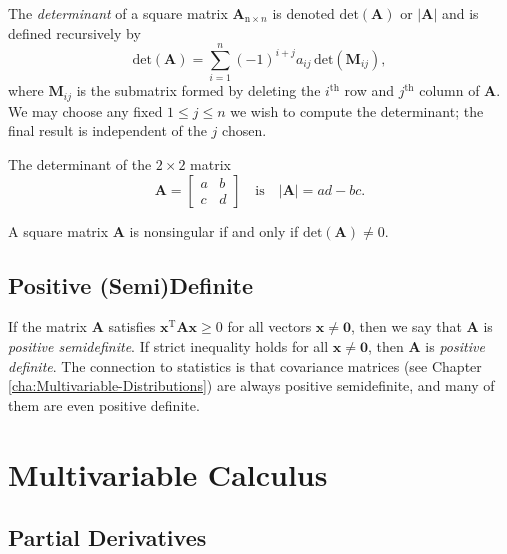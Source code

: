 \documentclass[captions=tableheading]{scrbook}
\begin{document}
\begin{defn}
The \emph{determinant} of a square matrix $\mathbf{A}_{\mathrm{n}\times n}$ is denoted $\mathrm{det}(\mathbf{A})$ or $|\mathbf{A}|$ and is defined recursively by
\begin{equation}
\mathrm{det}(\mathbf{A})=\sum_{i=1}^{n}(-1)^{i+j}a_{ij}\,\mathrm{det}(\mathbf{M}_{ij}),
\end{equation}
where $\mathbf{M}_{ij}$ is the submatrix formed by deleting the $i^{\mathrm{th}}$ row and $j^{\mathrm{th}}$ column of $\mathbf{A}$. We may choose any fixed $1\leq j\leq n$ we wish to compute the determinant; the final result is independent of the $j$ chosen.
\end{defn}
\begin{fact}
The determinant of the $2\times2$ matrix
\begin{equation}
\mathbf{A}=\begin{bmatrix}a & b\\
c & d\end{bmatrix}\quad\mbox{is}\quad|\mathbf{A}|=ad-bc.
\end{equation}
\end{fact}

\begin{fact}
A square matrix $\mathbf{A}$ is nonsingular if and only if $\mathrm{det}(\mathbf{A})\neq0$.
\end{fact}
\subsection{Positive (Semi)Definite}
\label{sec-6-5-3}

If the matrix $\mathbf{A}$ satisfies $\mathbf{x^{\mathrm{T}}}\mathbf{A}\mathbf{x}\geq0$ for all vectors $\mathbf{x}\neq\mathbf{0}$, then we say that $\mathbf{A}$ is \emph{positive semidefinite}. If strict inequality holds for all $\mathbf{x}\neq\mathbf{0}$, then $\mathbf{A}$ is \emph{positive definite}. The connection to statistics is that covariance matrices (see Chapter \ref{cha:Multivariable-Distributions}) are always positive semidefinite, and many of them are even positive definite.
\section{Multivariable Calculus \label{sec:Multivariable-Calculus}}
\label{sec-6-6}
\subsection{Partial Derivatives}
\label{sec-6-6-1}
\end{document}
